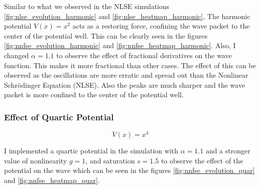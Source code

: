\documentclass[8pt, a4paper, twocolumn]{article}
\begin{document}
Similar to what we observed in the NLSE simulations \ref{fig:nlse_evolution_harmonic} and \ref{fig:nlse_heatmap_harmonic}, The harmonic potential $V(x) = x^2$ acts as a restoring force, confining the wave packet to the
center of the potential well. This can be clearly seen in the figures \ref{fig:nnfse_evolution_harmonic} and
\ref{fig:nnfse_heatmap_harmonic}. Also, I changed $\alpha = 1.1$ to observe the effect of
fractional derivatives on the wave function. This makes it more fractional than other cases. The effect of this
can be observed as the oscillations are more erratic and spread out than the Nonlinear Schrödinger Equation (NLSE). Also the peaks are much sharper and the wave packet is more confined to the center of the 
potential well.


\subsubsection{Effect of Quartic Potential}

\begin{equation}
	V(x) = x^4
\end{equation}

I implemented a quartic potential in the simulation with $\alpha = 1.1$ and a stronger value of nonlinearity $g = 1$, 
and saturation $s = 1.5$ to observe the effect of the potential on the wave which can be seen in 
the figures \ref{fig:nnfse_evolution_quar} and \ref{fig:nnfse_heatmap_quar}.\\
\end{document}
